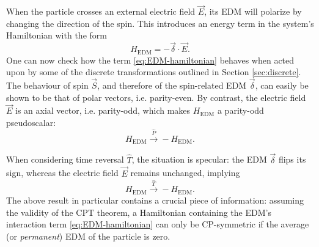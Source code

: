 When the particle crosses an external electric field $\vec{E}$, its EDM will polarize by changing the direction of the spin. This introduces an energy term in the system's Hamiltonian with the form
\begin{equation}
H_\text{EDM} = - \vec{\delta} \cdot \vec{E} .
\label{eq:EDM-hamiltonian}
\end{equation}
One can now check how the term \eqref{eq:EDM-hamiltonian} behaves when acted upon by some of the discrete transformations outlined in Section \ref{sec:discrete}.
The behaviour of spin $\vec{S}$, and therefore of the spin-related EDM $\vec{\delta}$, can easily be shown to be 
that of polar vectors, i.e. parity-even.
By contrast, the electric field $\vec{E}$ is an axial vector, i.e. parity-odd, which makes $H_\text{EDM}$ a parity-odd pseudoscalar:
\begin{equation}
H_\text{EDM} \xrightarrow{\hat{P}} - H_\text{EDM}.
\end{equation}

When considering time reversal $\hat{T}$, the situation is specular:
the EDM $\vec{\delta}$ flips its sign, whereas the electric field $\vec{E}$ remains unchanged, implying
\begin{equation}
H_\text{EDM} \xrightarrow{\hat{T}} - H_\text{EDM}.
\label{eq:EDM-hamiltonian-under-T}
\end{equation}
The above result in particular contains a crucial piece of information:
assuming the validity of the CPT theorem, a Hamiltonian containing the EDM's interaction term \eqref{eq:EDM-hamiltonian} can only be CP-symmetric if the average (or \textit{permanent}) EDM of the particle is zero.

